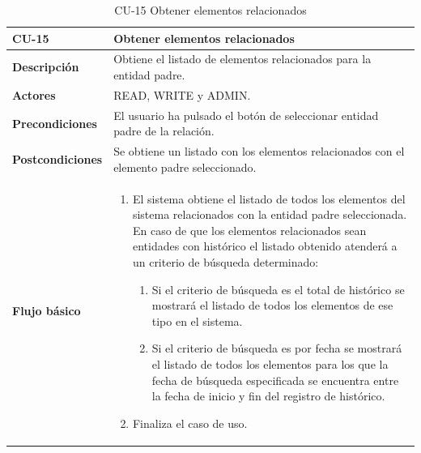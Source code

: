 \begin{table} [H]
    \centering
    \setlength{\leftmargini}{0.4cm}
	\resizebox{15cm}{!} { %
    \begin{tabular}{| m{3cm} | m{12cm} |}   
    \hline
	  \textbf{CU-15} & \textbf{Obtener elementos relacionados} \\\hline
	  \textbf{Descripción} & Obtiene el listado de elementos relacionados para la entidad padre. \\\hline
	  \textbf{Actores} & READ, WRITE y ADMIN. \\\hline
	  \textbf{Precondiciones} & El usuario ha pulsado el botón de seleccionar entidad padre de la relación. \\\hline
	  \textbf{Postcondiciones} & Se obtiene un listado con los elementos relacionados con el elemento padre seleccionado. \\\hline
	  \textbf{Flujo básico} & 
		\begin{enumerate}
	  	\item El sistema obtiene el listado de todos los elementos del sistema relacionados con la entidad padre seleccionada. En caso de que los elementos relacionados sean entidades con histórico el listado obtenido atenderá a un criterio de búsqueda determinado:
	  	    \begin{enumerate}	
			   \item Si el criterio de búsqueda es el total de histórico se mostrará el listado de todos los elementos de ese tipo en el sistema.
			   \item Si el criterio de búsqueda es por fecha se mostrará el listado de todos los elementos para los que la fecha de búsqueda especificada se encuentra entre la fecha de inicio y fin del registro de histórico.
			\end{enumerate}
		\item Finaliza el caso de uso.				
	  \end{enumerate} 	  	  
	  \\\hline
    \end{tabular}
    } %
    \caption{CU-15 Obtener elementos relacionados}
    \label{tab:cu-obtener-elementos-relacionados}
\end{table}


